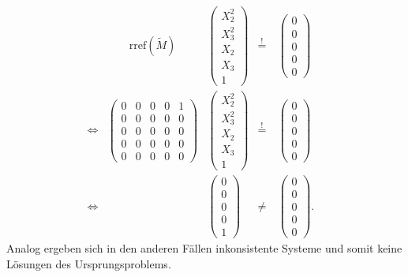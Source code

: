\documentclass[a4paper,oneside, 11pt, openany%
]{article}
\theoremstyle{custom}
\theoremstyle{custom}
\begin{document}
\begin{equation*}
	\begin{alignedat}{5}
		&\qquad\text{rref}(\tilde{M}) &\left( \begin{array}{c}				
			X_{2}^2\\
			X_{3}^2\\
			X_{2}\\
			X_{3}\\
			1
		\end{array}
		\right) &\overset{!}{=} \ & \left( \begin{array}{c}				
			0\\
			0\\
			0\\
			0\\
			0
		\end{array}
		\right)&\\
		\Leftrightarrow&
		\left( \begin{array}{ccccc}				
			0&0&0&0&1\\
			0&0&0&0&0\\
			0&0&0&0&0\\
			0&0&0&0&0\\
			0&0&0&0&0
		\end{array}
		\right)&
		\left( \begin{array}{c}				
			X_{2}^2\\
			X_{3}^2\\
			X_{2}\\
			X_{3}\\
			1
		\end{array}
		\right)&\overset{!}{=} \ &
		\left( \begin{array}{c}				
			0\\
			0\\
			0\\
			0\\
			0
		\end{array}
		\right)&\\
		\Leftrightarrow&&
		\left( \begin{array}{c}				
			0\\
			0\\
			0\\
			0\\
			1
		\end{array}
		\right) &\neq \ &
		\left( \begin{array}{c}				
			0\\
			0\\
			0\\
			0\\
			0
		\end{array}
		\right).
	\end{alignedat}
\end{equation*}
Analog ergeben sich in den anderen Fällen inkonsistente Systeme und somit keine Lösungen des Ursprungsproblems.
\end{document}
